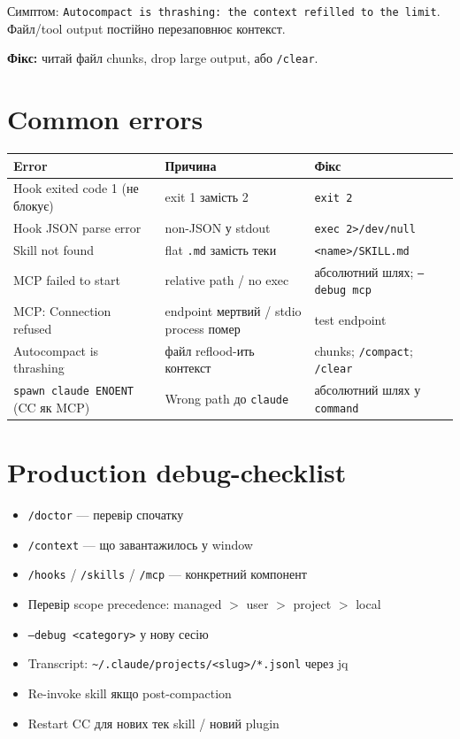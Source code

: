 \documentclass[11pt,a4paper]{article}
\begin{document}
Симптом: \texttt{Autocompact is thrashing: the context refilled to the limit}. Файл/tool output постійно перезаповнює контекст.

\textbf{Фікс:} читай файл chunks, drop large output, або \texttt{/clear}.

\section{Common errors}

\begin{tabular}{p{5cm}p{4.5cm}p{4.5cm}}
\hline
\textbf{Error} & \textbf{Причина} & \textbf{Фікс} \\
\hline
Hook exited code 1 (не блокує) & exit 1 замість 2 & \texttt{exit 2} \\
Hook JSON parse error & non-JSON у stdout & \texttt{exec 2>/dev/null} \\
Skill not found & flat \texttt{.md} замість теки & \texttt{<name>/SKILL.md} \\
MCP failed to start & relative path / no exec & абсолютний шлях; \texttt{--debug mcp} \\
MCP: Connection refused & endpoint мертвий / stdio process помер & test endpoint \\
Autocompact is thrashing & файл reflood-ить контекст & chunks; \texttt{/compact}; \texttt{/clear} \\
\texttt{spawn claude ENOENT} (CC як MCP) & Wrong path до \texttt{claude} & абсолютний шлях у \texttt{command} \\
\hline
\end{tabular}

\section{Production debug-checklist}

\begin{itemize}[leftmargin=2em]
\item[$\square$] \texttt{/doctor} --- перевір спочатку
\item[$\square$] \texttt{/context} --- що завантажилось у window
\item[$\square$] \texttt{/hooks} / \texttt{/skills} / \texttt{/mcp} --- конкретний компонент
\item[$\square$] Перевір scope precedence: managed $>$ user $>$ project $>$ local
\item[$\square$] \texttt{--debug <category>} у нову сесію
\item[$\square$] Transcript: \texttt{\textasciitilde/.claude/projects/<slug>/*.jsonl} через jq
\item[$\square$] Re-invoke skill якщо post-compaction
\item[$\square$] Restart CC для нових тек skill / новий plugin
\end{itemize}
\end{document}
